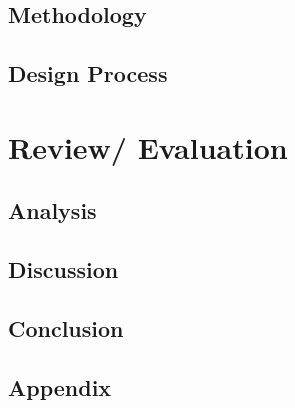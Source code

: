 \documentclass[UKenglish, a4paper]{ifimaster}
\begin{document}
\chapter{ Methodology}


\chapter{ Design Process}



\part{Review/ Evaluation }

\chapter{ Analysis}


\chapter{ Discussion}


\chapter{ Conclusion}


\backmatter{}

\printbibliography[nottype=online]
\printbibliography[type=online,title={Web sources}]

\appendix
\chapter{Appendix}

\end{document}
